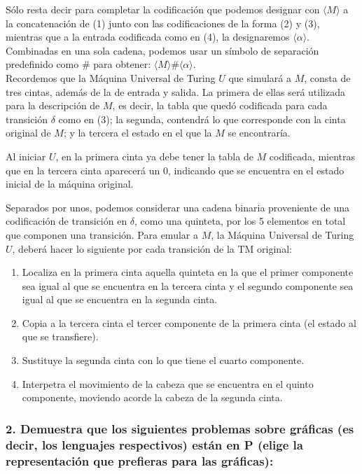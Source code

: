 \documentclass[12pt]{article}
\begin{document}
Sólo resta decir para completar la codificación que podemos designar con $\langle M\rangle$ a la concatenación de (1) junto con las codificaciones de la forma (2) y (3), mientras que a la entrada codificada como en (4), la designaremos $\langle \alpha\rangle$. Combinadas en una sola cadena,
podemos usar un símbolo de separación predefinido como $\#$ para obtener: $\langle M\rangle \# \langle \alpha\rangle$.\\
 
Recordemos que la Máquina Universal de Turing $U$ que simulará a $M$, consta de tres cintas, además de la de entrada y salida. La primera de ellas
será utilizada para la descripción de $M$, es decir, la tabla que quedó codificada para cada transición $\delta$ como en (3); la segunda, contendrá lo que corresponde con la cinta original de $M$; y la tercera el estado en el que la $M$ se encontraría.

Al iniciar $U$, en la primera cinta ya debe tener la tabla de $M$ codificada, mientras que en la tercera cinta aparecerá un 0, indicando que se encuentra en el estado inicial de la máquina original.

Separados por unos, podemos considerar una cadena binaria proveniente de una codificación de transición en $\delta$, como una quinteta, por los 5 elementos en total que componen una transición. Para emular a $M$, la Máquina Universal de Turing $U$, deberá hacer lo siguiente por cada
transición de la TM original:\\
\begin{enumerate}
\item Localiza en la primera cinta aquella quinteta en la que el primer componente sea igual al que se encuentra en la tercera cinta y el segundo
  componente sea igual al que se encuentra en la segunda cinta.
\item Copia a la tercera cinta el tercer componente de la primera cinta (el estado al que se transfiere).
\item Sustituye la segunda cinta con lo que tiene el cuarto componente.
\item Interpetra el movimiento de la cabeza que se encuentra en el quinto componente, moviendo acorde la cabeza de la segunda cinta. 
\end{enumerate}
\subsubsection*{2. Demuestra que los siguientes problemas sobre gráficas (es decir, los lenguajes respectivos) están en P (elige la representación que prefieras para las gráficas):}
 
\end{document}
